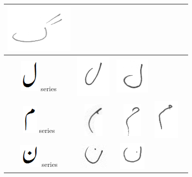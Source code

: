 \begin{table}[h]
\begin{tabular}{@{}ccccc@{}}
\includegraphics[scale=0.10]{66}  & \\
\hline
\includegraphics[scale=0.15]{Laam_orig} series & \includegraphics[scale=0.15]{67} & \includegraphics[scale=0.15]{68}  & &  \\
\hline
\includegraphics[scale=0.15]{meem_orig} series & \includegraphics[scale=0.15]{69} & \includegraphics[scale=0.15]{70}  &
\includegraphics[scale=0.15]{71}  & \\
\hline
\includegraphics[scale=0.15]{noon_orig} series & \includegraphics[scale=0.15]{72} & \includegraphics[scale=0.15]{73} & & \\

\end{tabular}
\end{table}
